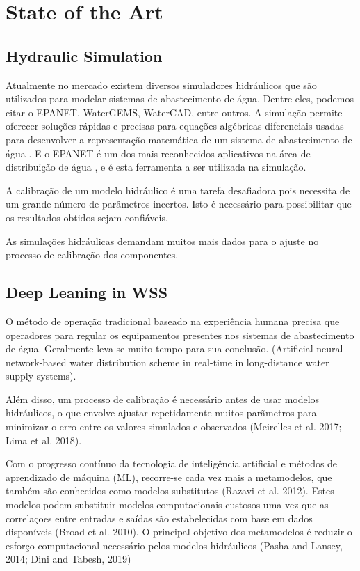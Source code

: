 \chapter{State of the Art}%
\label{chapter:state-of-the-art}



\section{Hydraulic Simulation}

Atualmente no mercado existem diversos simuladores hidráulicos que são utilizados para modelar sistemas de abastecimento de água. Dentre eles, podemos citar o EPANET, WaterGEMS, WaterCAD, entre outros. A simulação permite oferecer soluções rápidas e precisas para equações algébricas diferenciais usadas para desenvolver a representação matemática de um sistema de abastecimento de água \cite{rfc1}. E o EPANET é um dos mais reconhecidos aplicativos na área de distribuição de água \cite{rfc4}, e é esta ferramenta a ser utilizada na simulação.

A calibração de um modelo hidráulico é uma tarefa desafiadora pois necessita de um grande número de parâmetros incertos\cite{rfc3}. Isto é necessário para possibilitar que os resultados obtidos sejam confiáveis. 

As simulações hidráulicas demandam muitos mais dados para o ajuste no processo de calibração dos componentes. 


\section{Deep Leaning in WSS}

O método de operação tradicional baseado na experiência humana precisa que operadores para regular os equipamentos presentes nos sistemas de abastecimento de água. Geralmente leva-se muito tempo para sua conclusão.  (Artificial neural network-based water distribution scheme in real-time in long-distance water supply systems).

Além disso, um processo de calibração é necessário antes de usar modelos hidráulicos, o que envolve ajustar repetidamente muitos parãmetros para minimizar o erro entre os valores simulados e observados (Meirelles et al. 2017; Lima et al. 2018).

Com o progresso contínuo da tecnologia de inteligência artificial e métodos de aprendizado de máquina (ML), 
recorre-se cada vez mais a metamodelos, que também são conhecidos como modelos substitutos (Razavi et al. 2012). Estes modelos podem substituir modelos computacionais custosos uma vez que as correlaçoes entre entradas e saídas são estabelecidas com base em dados disponíveis (Broad et al. 2010). O principal objetivo dos metamodelos é reduzir o esforço computacional necessário pelos modelos hidráulicos (Pasha and Lansey, 2014; Dini and Tabesh, 2019)

